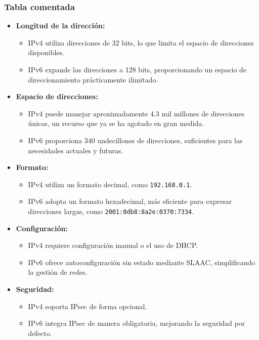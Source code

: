 \documentclass[a4paper,12pt]{article}
\begin{document}
\subsubsection*{Tabla comentada}

\begin{itemize}
    \item \textbf{Longitud de la dirección:}
    \begin{itemize}
        \item IPv4 utiliza direcciones de 32 bits, lo que limita el espacio de direcciones disponibles.
        \item IPv6 expande las direcciones a 128 bits, proporcionando un espacio de direccionamiento prácticamente ilimitado.
    \end{itemize}

    \item \textbf{Espacio de direcciones:}
    \begin{itemize}
        \item IPv4 puede manejar aproximadamente 4.3 mil millones de direcciones únicas, un recurso que ya se ha agotado en gran medida.
        \item IPv6 proporciona \( 340 \) undecillones de direcciones, suficientes para las necesidades actuales y futuras.
    \end{itemize}

    \item \textbf{Formato:}
    \begin{itemize}
        \item IPv4 utiliza un formato decimal, como \texttt{192.168.0.1}.
        \item IPv6 adopta un formato hexadecimal, más eficiente para expresar direcciones largas, como \texttt{2001:0db8:8a2e:0370:7334}.
    \end{itemize}

    \item \textbf{Configuración:}
    \begin{itemize}
        \item IPv4 requiere configuración manual o el uso de DHCP.
        \item IPv6 ofrece autoconfiguración sin estado mediante SLAAC, simplificando la gestión de redes.
    \end{itemize}

    \item \textbf{Seguridad:}
    \begin{itemize}
        \item IPv4 soporta IPsec de forma opcional.
        \item IPv6 integra IPsec de manera obligatoria, mejorando la seguridad por defecto.
    \end{itemize}


\end{itemize}
\end{document}
